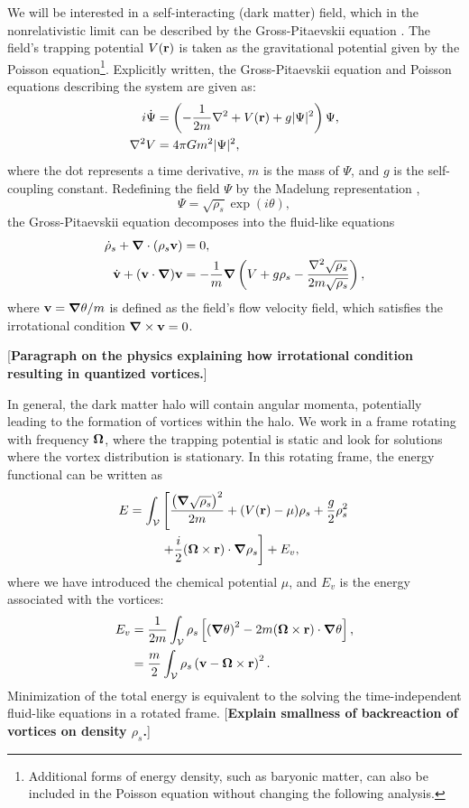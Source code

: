 \documentclass[aps,prd,twocolumn,nofootinbib,superscriptaddress]{revtex4-1}
\newcommand{\bfnab}{{\boldsymbol \nabla}}
\begin{document}
We will be interested in a self-interacting (dark matter) field, which in the nonrelativistic limit can be described by the Gross-Pitaevskii equation \cite{Hui:2016ltb}.  The field's trapping potential $V({\bf r})$ is taken as the gravitational potential given by the Poisson equation\footnote{Additional forms of energy density, such as baryonic matter, can also be included in the Poisson equation without changing the following analysis.}.  Explicitly written, the Gross-Pitaevskii equation and Poisson equations describing the system are given as:
\begin{align}
i\dot{\Psi} &= \left(-\frac{1}{2m}\nabla^2 + V({\bf r}) + g |\Psi|^2\right)\Psi, \\
\nabla^2 V &= 4\pi G m^2|\Psi|^2,
\end{align}
where the dot represents a time derivative, $m$ is the mass of $\Psi$, and $g$ is the self-coupling constant.  Redefining the field $\Psi$ by the Madelung representation \cite{Madelung},
\begin{equation}
\Psi = \sqrt{\rho_s}\exp(i\theta),
\end{equation}
the Gross-Pitaevskii equation decomposes into the fluid-like equations
\begin{align}
\dot{\rho}_s + \bfnab \cdot\left(\rho_s{\bf v}\right) &= 0,\\
\dot{\bf v} + ({\bf v}\cdot\bfnab){\bf v} &= -\frac{1}{m}\bfnab\left(V + g\rho_s - \frac{\nabla^2\sqrt{\rho_s}}{2m\sqrt{\rho_s}}\right),
\end{align}
where ${\bf v} = \bfnab\theta/m$ is defined as the field's flow velocity field, which satisfies the irrotational condition $\bfnab \times {\bf v} = 0$.

[{\bf Paragraph on the physics explaining how irrotational condition resulting in quantized vortices.}]

In general, the dark matter halo will contain angular momenta, potentially leading to the formation of vortices within the halo.  We work in a frame rotating with frequency ${\bf \Omega}$, where the trapping potential is static and look for solutions where the vortex distribution is stationary.  In this rotating frame, the energy functional can be written as
\begin{align}
E = \int_\mathcal{V}&\left[\frac{\left(\bfnab \sqrt{\rho_s}\right)^2}{2m} + (V({\bf r})-\mu)\rho_s + \frac{g}{2}\rho_s^2\right.\nonumber\\
&\left. + \frac{i}{2}({\bf \Omega}\times {\bf r})\cdot\bfnab\rho_s\right] + E_v,
\end{align}
where we have introduced the chemical potential $\mu$, and $E_v$ is the energy associated with the vortices:
\begin{align}
E_v &= \frac{1}{2m}\int_\mathcal{V}\rho_s\left[\left(\bfnab \theta\right)^2 - 2m({\bf \Omega}\times {\bf r})\cdot \bfnab \theta \right],\nonumber\\
&= \frac{m}{2}\int_\mathcal{V}\rho_s\left({\bf v} - {\bf \Omega}\times {\bf r}\right)^2.
\end{align}
Minimization of the total energy is equivalent to the solving the time-independent fluid-like equations in a rotated frame. [{\bf Explain smallness of backreaction of vortices on density $\rho_s$.}]
\end{document}
